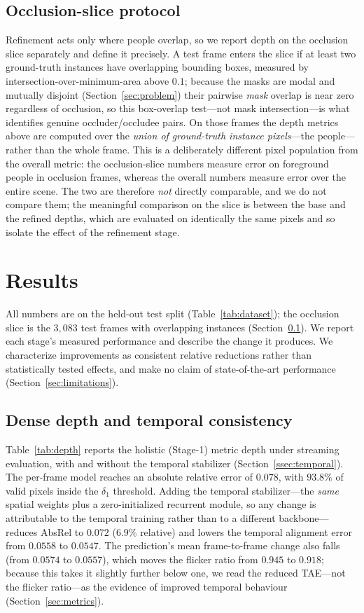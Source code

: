 \documentclass[sigconf, review=true]{acmart}
\begin{document}
\subsection{Occlusion-slice protocol}
\label{ssec:occprotocol}
Refinement acts only where people overlap, so we report depth on the occlusion
slice separately and define it precisely. A test frame enters the slice if at
least two ground-truth instances have overlapping bounding boxes, measured by
intersection-over-minimum-area above $0.1$; because the masks are modal and
mutually disjoint (Section~\ref{sec:problem}) their pairwise \emph{mask} overlap
is near zero regardless of occlusion, so this box-overlap test---not mask
intersection---is what identifies genuine occluder/occludee pairs. On those
frames the depth metrics above are computed over the \emph{union of
ground-truth instance pixels}---the people---rather than the whole frame. This
is a deliberately different pixel population from the overall metric: the
occlusion-slice numbers measure error on foreground people in occlusion frames,
whereas the overall numbers measure error over the entire scene. The two are
therefore \emph{not} directly comparable, and we do not compare them; the
meaningful comparison on the slice is between the base and the refined depths,
which are evaluated on identically the same pixels and so isolate the effect of
the refinement stage.

\section{Results}
\label{sec:results}
All numbers are on the held-out test split (Table~\ref{tab:dataset}); the
occlusion slice is the $3{,}083$ test frames with overlapping instances
(Section~\ref{ssec:occprotocol}). We report each stage's measured performance
and describe the change it produces. We characterize improvements as consistent
relative reductions rather than statistically tested effects, and make no claim
of state-of-the-art performance (Section~\ref{sec:limitations}).

\subsection{Dense depth and temporal consistency}
Table~\ref{tab:depth} reports the holistic (Stage-1) metric depth under
streaming evaluation, with and without the temporal stabilizer
(Section~\ref{ssec:temporal}). The per-frame model reaches an absolute relative
error of $0.078$, with $93.8\%$ of valid pixels inside the $\delta_1$ threshold.
Adding the temporal stabilizer---the \emph{same} spatial weights plus a
zero-initialized recurrent module, so any change is attributable to the temporal
training rather than to a different backbone---reduces AbsRel to $0.072$ ($6.9\%$
relative) and lowers the temporal alignment error from $0.0558$ to $0.0547$. The
prediction's mean frame-to-frame change also falls (from $0.0574$ to $0.0557$),
which moves the flicker ratio from $0.945$ to $0.918$; because this takes it
slightly further below one, we read the reduced TAE---not the flicker ratio---as
the evidence of improved temporal behaviour (Section~\ref{sec:metrics}).
\end{document}

